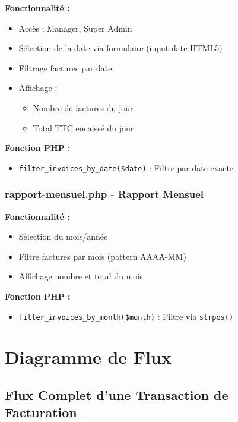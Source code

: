 \documentclass[12pt,a4paper]{report}
\begin{document}
\textbf{Fonctionnalité :}
\begin{itemize}
    \item Accès : Manager, Super Admin
    \item Sélection de la date via formulaire (input date HTML5)
    \item Filtrage factures par date
    \item Affichage :
        \begin{itemize}
            \item Nombre de factures du jour
            \item Total TTC encaissé du jour
        \end{itemize}
\end{itemize}

\textbf{Fonction PHP :}
\begin{itemize}
    \item \texttt{filter\_invoices\_by\_date(\$date)} : Filtre par date exacte
\end{itemize}

\subsection{rapport-mensuel.php - Rapport Mensuel}

\textbf{Fonctionnalité :}
\begin{itemize}
    \item Sélection du mois/année
    \item Filtre factures par mois (pattern AAAA-MM)
    \item Affichage nombre et total du mois
\end{itemize}

\textbf{Fonction PHP :}
\begin{itemize}
    \item \texttt{filter\_invoices\_by\_month(\$month)} : Filtre via \texttt{strpos()}
\end{itemize}

\chapter{Diagramme de Flux}

\section{Flux Complet d'une Transaction de Facturation}
\end{document}

